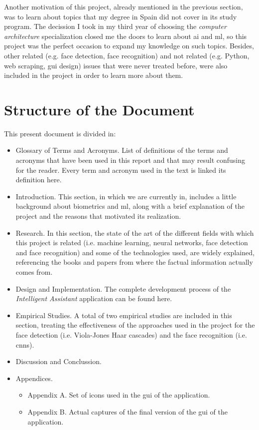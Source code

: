 Another motivation of this project, already mentioned in the previous section, was to learn about topics that my degree in Spain did not cover in its study program. The decission I took in my third year of choosing the \textit{computer architecture} specialization closed me the doors to learn about \gls{ai} and \gls{ml}, so this project was the perfect occasion to expand my knowledge on such topics. Besides, other related (e.g. face detection, face recognition) and not related (e.g. Python, web \gls{scraping}, \gls{gui} design) issues that were never treated before, were also included in the project in order to learn more about them. 

\section{Structure of the Document}
This present document is divided in:

\begin{itemize}
	\item Glossary of Terms and Acronyms. List of definitions of the terms and acronyms that have been used in this report and that may result confusing for the reader. Every term and acronym used in the text is linked its definition here.
	\item Introduction. This section, in which we are currently in, includes a little background about biometrics and \gls{ml}, along with a brief explanation of the project and the reasons that motivated its realization.  
	\item Research. In this section, the state of the art of the different fields with which this project is related (i.e. machine learning, neural networks, face detection and face recognition) and some of the technologies used, are widely explained, referencing the books and papers from where the factual information actually comes from. 
	\item Design and Implementation. The complete development process of the \textit{Intelligent Assistant} application can be found here.
	\item Empirical Studies. A total of two empirical studies are included in this section, treating the effectiveness of the approaches used in the project for the face detection (i.e. Viola-Jones Haar cascades) and the face recognition (i.e. \glspl{cnn}).
	\item Discussion and Conclussion.
	\item Appendices. 
	\begin{itemize}
		\item Appendix A. Set of icons used in the \gls{gui} of the application.
		\item Appendix B. Actual captures of the final version of the \gls{gui} of the application.
	\end{itemize}
\end{itemize}




